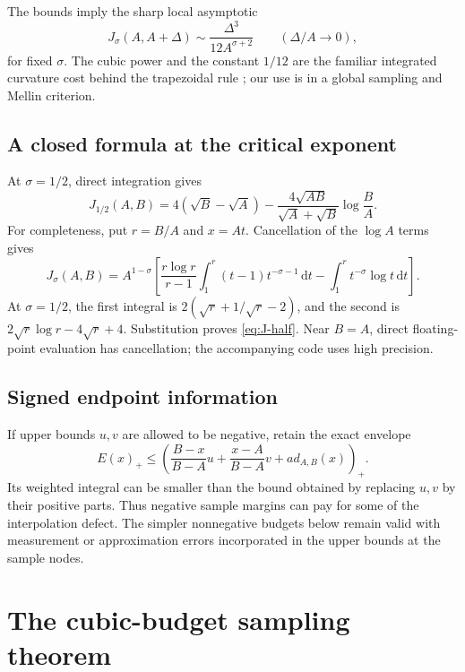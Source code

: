 \documentclass[11pt]{article}
\theoremstyle{definition}
\newcommand{\dd}{\,\mathrm d}
\begin{document}
The bounds imply the sharp local asymptotic
\begin{equation}\label{eq:local-asymptotic}
 J_\sigma(A,A+\Delta)
 \sim\frac{\Delta^3}{12A^{\sigma+2}}
 \qquad(\Delta/A\longrightarrow0),
\end{equation}
for fixed \(\sigma\). The cubic power and the constant \(1/12\) are the
familiar integrated curvature cost behind the trapezoidal rule
\cite{dlmf}; our use is in a global sampling and Mellin criterion.

\subsection{A closed formula at the critical exponent}

At \(\sigma=1/2\), direct integration gives
\begin{equation}\label{eq:J-half}
 \boxed{\displaystyle
 J_{1/2}(A,B)=4(\sqrt B-\sqrt A)
   -\frac{4\sqrt{AB}}{\sqrt A+\sqrt B}\log\frac BA.}
\end{equation}
For completeness, put \(r=B/A\) and \(x=At\). Cancellation of the
\(\log A\) terms gives
\[
 J_\sigma(A,B)=A^{1-\sigma}
 \left[\frac{r\log r}{r-1}\int_1^r(t-1)t^{-\sigma-1}\dd t
       -\int_1^rt^{-\sigma}\log t\dd t\right].
\]
At \(\sigma=1/2\), the first integral is
\(2(\sqrt r+1/\sqrt r-2)\), and the second is
\(2\sqrt r\log r-4\sqrt r+4\). Substitution proves
\eqref{eq:J-half}. Near \(B=A\), direct floating-point evaluation has
cancellation; the accompanying code uses high precision.

\subsection{Signed endpoint information}

If upper bounds \(u,v\) are allowed to be negative, retain the exact
envelope
\begin{equation}\label{eq:signed-envelope}
 E(x)_+\leq
 \left(\frac{B-x}{B-A}u+\frac{x-A}{B-A}v
             +ad_{A,B}(x)\right)_+.
\end{equation}
Its weighted integral can be smaller than the bound obtained by replacing
\(u,v\) by their positive parts. Thus negative sample margins can pay for
some of the interpolation defect. The simpler nonnegative budgets below
remain valid with measurement or approximation errors incorporated in
the upper bounds at the sample nodes.

\section{The cubic-budget sampling theorem}
\label{sec:mesh}
\end{document}
